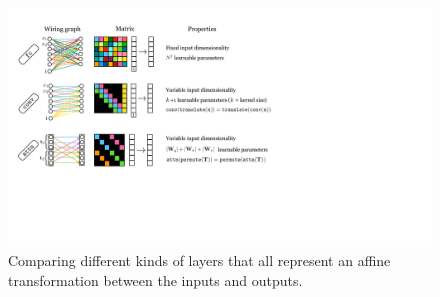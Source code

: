 





\begin{figure}[t]
    \centerline{
        \includegraphics[width=1.0\linewidth]{figures/transformers/affine_layer_comparison.pdf}
    }
    \caption{Comparing different kinds of layers that all represent an affine transformation between the inputs and outputs.}
  \label{fig:transformers:affine_layer_comparison}
\end{figure}

